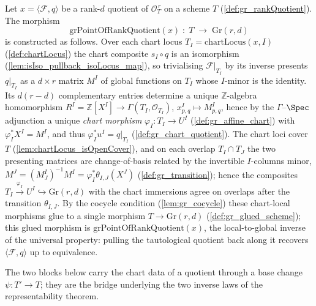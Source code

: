 \begin{definition}
  \label{def:grPointOfRankQuotient}
  Let \(x = \langle \mathcal{F}, q\rangle\) be a rank-\(d\) quotient of
  \(\mathcal{O}_T^{\,r}\) on a scheme \(T\) (\cref{def:gr_rankQuotient}). The morphism
  \[
    \mathrm{grPointOfRankQuotient}(x) \;:\; T \;\longrightarrow\; \mathrm{Gr}(r,d)
  \]
  is constructed as follows. Over each chart locus \(T_I = \mathrm{chartLocus}(x, I)\)
  (\cref{def:chartLocus}) the chart composite \(s_I \circ q\) is an isomorphism
  (\cref{lem:isIso_pullback_isoLocus_map}), so trivialising \(\mathcal{F}|_{T_I}\) by its
  inverse presents \(q|_{T_I}\) as a \(d \times r\) matrix \(M^I\) of global functions on
  \(T_I\) whose \(I\)-minor is the identity. Its \(d(r-d)\) complementary entries determine a
  unique \(\mathbb{Z}\)-algebra homomorphism \(R^I = \mathbb{Z}[X^I] \to \Gamma(T_I,
  \mathcal{O}_{T_I})\), \(x^I_{p,q} \mapsto M^I_{p,q}\), hence by the \(\Gamma\)--\(\Spec\)
  adjunction a unique \emph{chart morphism} \(\varphi_I : T_I \to U^I\)
  (\cref{def:gr_affine_chart}) with \(\varphi_I^{*}X^I = M^I\), and thus
  \(\varphi_I^{*}u^I = q|_{T_I}\) (\cref{def:gr_chart_quotient}). The chart loci cover \(T\)
  (\cref{lem:chartLocus_isOpenCover}), and on each overlap \(T_I \cap T_J\) the two
  presenting matrices are change-of-basis related by the invertible \(I\)-columns minor,
  \(M^J = (M^I_J)^{-1} M^I = \varphi_I^{*}\theta_{I,J}(X^J)\)
  (\cref{def:gr_transition}); hence the composites \(T_I \xrightarrow{\varphi_I} U^I
  \hookrightarrow \mathrm{Gr}(r,d)\) with the chart immersions agree on overlaps after the
  transition \(\theta_{I,J}\). By the cocycle condition (\cref{lem:gr_cocycle}) these
  chart-local morphisms glue to a single morphism \(T \to \mathrm{Gr}(r,d)\)
  (\cref{def:gr_glued_scheme}); this glued morphism is
  \(\mathrm{grPointOfRankQuotient}(x)\), the local-to-global inverse of the universal
  property: pulling the tautological quotient back along it recovers \(\langle \mathcal{F},
  q\rangle\) up to equivalence.
\end{definition}

The two blocks below carry the chart data of a quotient through a base change
\(\psi : T' \to T\); they are the bridge underlying the two inverse laws of the
representability theorem.

